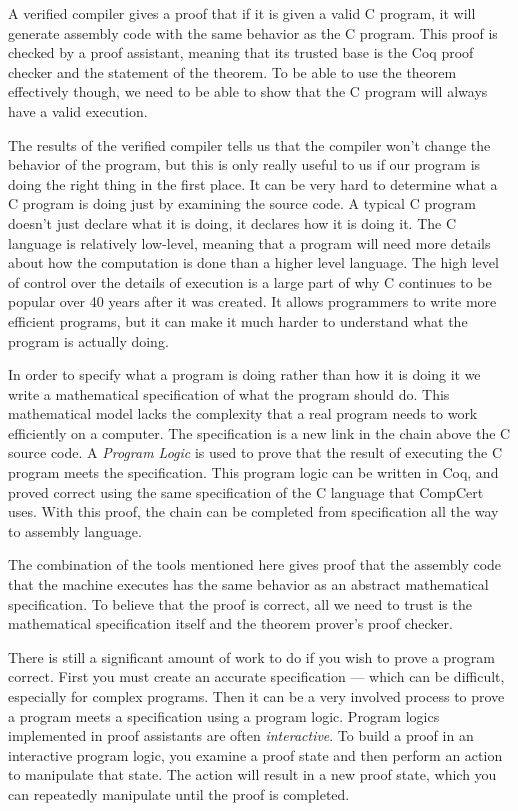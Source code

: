 \documentclass{puthesis}
\begin{document}
A verified compiler gives a proof that if it is given a valid C
program, it will generate assembly code with the same behavior as the
C program. This proof is checked by a proof assistant, meaning that
its trusted base is the Coq proof checker and the statement of the
theorem. To be able to use the theorem effectively though, we need to
be able to show that the C program will always have a valid execution.

The results of the verified compiler tells us that the compiler won't
change the behavior of the program, but this is only really useful to
us if our program is doing the right thing in the first place. It can
be very hard to determine what a C program is doing just by examining
the source code.  A typical C program doesn't just declare what it is
doing, it declares how it is doing it. The C language is relatively
low-level, meaning that a program will need more details about how the
computation is done than a higher level language. The high level of
control over the details of execution is a large part of why C
continues to be popular over 40 years after it was created. It allows
programmers to write more efficient programs, but it can make it much
harder to understand what the program is actually doing.

In order to specify what a program is doing rather than how it is
doing it we write a mathematical specification of what the program
should do. This mathematical model lacks the complexity that a real
program needs to work efficiently on a computer.  The specification is
a new link in the chain above the C source code. A
\emph{Program Logic} is used to prove that the result of executing the
C program meets the specification. This program logic can be written
in Coq, and proved correct using the same specification of the C
language that CompCert uses. With this proof, the chain can be
completed from specification all the way to assembly language.

The combination of the tools mentioned here gives proof that the
assembly code that the machine executes has the same behavior as an
abstract mathematical specification. To believe that the proof is
correct, all we need to trust is the mathematical specification itself
and the theorem prover's proof checker.

There is still a significant amount of work to do if you wish to prove
a program correct. First you must create an accurate specification ---
which can be difficult, especially for complex programs. Then it can
be a very involved process to prove a program meets a specification
using a program logic. Program logics implemented in proof assistants
are often \emph{interactive}. To build a proof in an interactive
program logic, you examine a proof state and then perform an action to
manipulate that state. The action will result in a new proof state,
which you can repeatedly manipulate until the proof is completed.
\end{document}
